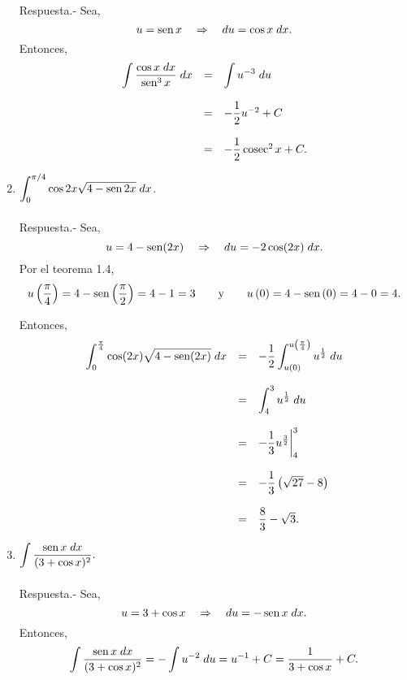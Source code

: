 \begin{enumerate}[\bfseries 1.]
	Respuesta.-\; Sea,
	$$u=\mathop{\mbox{\normalfont sen}}\nolimits x \quad \Rightarrow \quad du=\cos x\; dx.$$
	Entonces,
	$$\begin{array}{rcl}
	    \displaystyle \int \dfrac{\cos x \; dx}{\mathop{\mbox{\normalfont sen}}\nolimits^3 x}\; dx &=& \displaystyle \int u^{-3}\; du\\\\
								   &=& -\dfrac{1}{2}u^{-2}+C\\\\
								   &=& -\dfrac{1}{2}\mathop{\mbox{\normalfont cosec}}\nolimits^{2} x +C.
	\end{array}$$
	\vspace{.5cm}

    \item $\displaystyle\int_0^{\pi/4} \cos 2 x\sqrt{4-\mathop{\mbox{\normalfont sen}}\nolimits 2x}\; dx$.\\\\

	Respuesta.- Sea,
	$$u=4-\mathop{\mbox{\normalfont sen}}\nolimits(2x)\quad \Rightarrow \quad du=-2\cos(2x)\; dx.$$
	Por el teorema 1.4,
	$$u\left(\dfrac{\pi}{4}\right)=4-\mathop{\mbox{\normalfont sen}}\nolimits\left(\dfrac{\pi}{2}\right)=4-1=3 \qquad \mbox{y}\qquad u\left(0\right)=4-\mathop{\mbox{\normalfont sen}}\nolimits\left(0\right)=4-0=4.$$

	Entonces,
	$$\begin{array}{rcl}
	    \displaystyle\int_0^{\frac{\pi}{4}} \cos(2x) \sqrt{4-\mathop{\mbox{\normalfont sen}}\nolimits(2x)}\; dx &=& \displaystyle-\dfrac{1}{2}\int_{u(0)}^{u\left(\frac{\pi}{4}\right)} u^{\frac{1}{2}}\; du\\\\
										&=&\displaystyle \int_4^3 u^{\frac{1}{2}}\; du\\\\
										&=& -\dfrac{1}{3}u^{\frac{3}{2}}\bigg|_4^3\\\\
										&=&-\dfrac{1}{3}\left(\sqrt{27}-8\right)\\\\
										&=&\dfrac{8}{3}-\sqrt{3}.
	\end{array}$$
	\vspace{.5cm}


    \item $\displaystyle\int \dfrac{\mathop{\mbox{\normalfont sen}}\nolimits x\; dx}{(3+\cos x)^2}.$\\\\

	Respuesta.-\; Sea,
	$$u=3+\cos x \quad \Rightarrow \quad du=-\mathop{\mbox{\normalfont sen}}\nolimits x\; dx.$$
	Entonces,
	$$\int \dfrac{\mathop{\mbox{\normalfont sen}}\nolimits x\; dx}{(3+\cos x)^2}=-\int u^{-2}\; du = u^{-1}+C = \dfrac{1}{3+\cos x}+C.$$\\


\end{enumerate}
